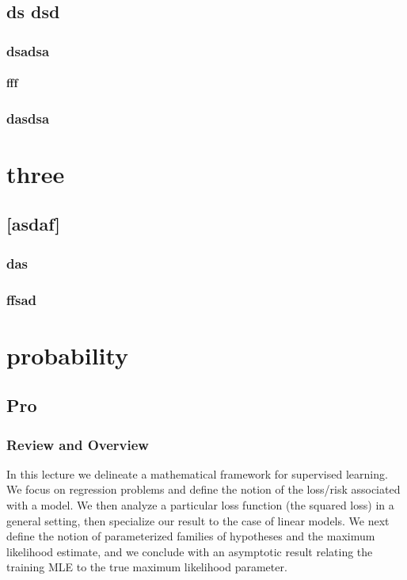 \documentclass[]{subook}
\begin{document}
\chapter{ds dsd}

\section{dsadsa}

\lipsum[1-6]
\subsection{fff}
\lipsum[2]
\section{dasdsa}
\lipsum[2-4]

\part{three}
\chapter{[asdaf]}
\section{das}
\lipsum[1-3]

\section{ffsad}
\lipsum[1-6]


\part{probability}

\chapter{Pro}
\newcommand{\cX}{\mathcal{X}}
\newcommand{\cY}{\mathcal{Y}}

\section{Review and Overview}
In this lecture we delineate a mathematical framework for supervised learning. We focus on regression problems and define the notion of the loss/risk associated with a model. We then analyze a particular loss function (the squared loss) in a general setting, then specialize our result to the case of linear models. We next define the notion of parameterized families of hypotheses and the maximum likelihood estimate, and we conclude with an asymptotic result relating the training MLE to the true maximum likelihood parameter.
\end{document}

